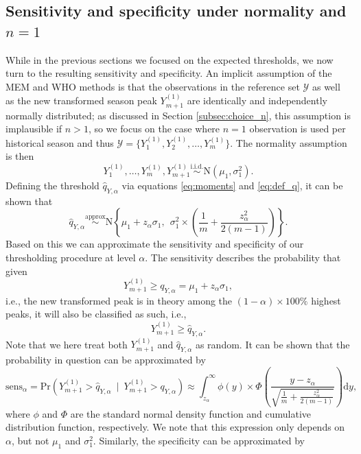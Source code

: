 \documentclass{article}
\begin{document}
\subsection{Sensitivity and specificity under normality and $n = 1$}
\label{subsec:theory_sensitivity}

While in the previous sections we focused on the expected thresholds, we now turn to the resulting sensitivity and specificity. An implicit assumption of the MEM and WHO methods is that the observations in the reference set $\mathcal{Y}$ as well as the new transformed season peak $Y_{m + 1}^{(1)}$ are identically and independently normally distributed; as discussed in Section \ref{subsec:choice_n}, this assumption is implausible if $n > 1$, so we focus on the case where $n = 1$ observation is used per historical season and thus $\mathcal{Y} = \{Y_1^{(1)}, Y_2^{(1)}, \dots, Y_m^{(1)}\}$. The normality assumption is then
$$
Y_1^{(1)}, \dots, Y_m^{(1)}, Y_{m + 1}^{(1)} \stackrel{\text{i.i.d.}}{\sim} \text{N}(\mu_1, \sigma^2_1).
$$
Defining the threshold $\hat{q}_{Y, \alpha}$ via equations \eqref{eq:moments} and \eqref{eq:def_q}, it can be shown that
\begin{equation}
\hat{q}_{Y, \alpha} \stackrel{\text{approx}}{\sim} \text{N}\left\{\mu_1 + z_\alpha \sigma_1,\ \ \sigma_1^2 \times \left(\frac{1}{m} + \frac{z_\alpha^2}{2(m - 1)} \right) \right\}.
\label{eq:q_Y}
\end{equation}
Based on this we can approximate the sensitivity and specificity of our thresholding procedure at level $\alpha$. The sensitivity describes the probability that given
$$
Y_{m + 1}^{(1)} \geq q_{Y, \alpha} = \mu_1 + z_\alpha \sigma_1,
$$
i.e., the new transformed peak is in theory among the $(1 - \alpha) \times 100\%$ highest peaks, it will also be classified as such, i.e.,
$$
Y_{m + 1}^{(1)} \geq \hat{q}_{Y, \alpha}.
$$
Note that we here treat both $Y_{m + 1}^{(1)}$ and $\hat{q}_{Y, \alpha}$ as random. It can be shown that the probability in question can be approximated by
\begin{equation}
\text{sens}_\alpha = \text{Pr}(Y_{m + 1}^{(1)} > \hat{q}_{Y, \alpha} \ \mid \ Y_{m + 1}^{(1)} > q_{Y, \alpha}) \approx \int_{z_\alpha}^\infty \phi(y) \times \Phi\left(\frac{y - z_\alpha}{\sqrt{\frac{1}{m} + \frac{z_\alpha^2}{2(m - 1)}}}\right) \text{d}y,
\label{eq:sens}
\end{equation}
where $\phi$ and $\Phi$ are the standard normal density function and cumulative distribution function, respectively. We note that this expression only depends on $\alpha$, but not $\mu_1$ and $\sigma^2_1$. Similarly, the specificity can be approximated by
\end{document}
